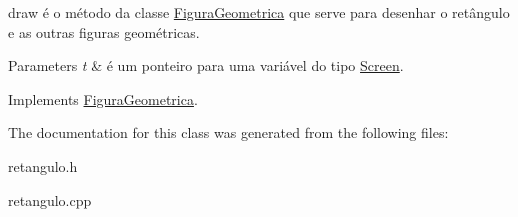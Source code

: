 draw é o método da classe \hyperlink{classFiguraGeometrica}{Figura\+Geometrica} que serve para desenhar o retângulo e as outras figuras geométricas. 


\begin{DoxyParams}{Parameters}
{\em t} & é um ponteiro para uma variável do tipo \hyperlink{classScreen}{Screen}. \\
\hline
\end{DoxyParams}


Implements \hyperlink{classFiguraGeometrica_a8ee8dedc060b6059a805ea091aef2c41}{Figura\+Geometrica}.



The documentation for this class was generated from the following files\+:\begin{DoxyCompactItemize}
\item 
retangulo.\+h\item 
retangulo.\+cpp\end{DoxyCompactItemize}
